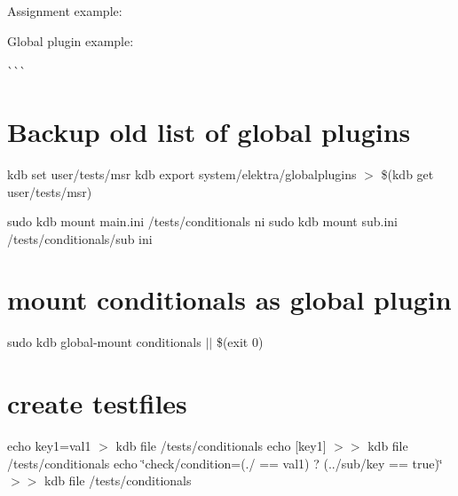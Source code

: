 Assignment example\+:


\begin{DoxyCode}{0}
\DoxyCodeLine{}
\DoxyCodeLine{}
\end{DoxyCode}


Global plugin example\+:

\`{}\`{}\`{} \hypertarget{autotoc_md88_autotoc_md97}{}\section{Backup old list of global plugins}\label{autotoc_md88_autotoc_md97}
kdb set user/tests/msr  kdb export system/elektra/globalplugins $>$ \$(kdb get user/tests/msr)

sudo kdb mount main.\+ini /tests/conditionals ni sudo kdb mount sub.\+ini /tests/conditionals/sub ini\hypertarget{autotoc_md88_autotoc_md98}{}\section{mount conditionals as global plugin}\label{autotoc_md88_autotoc_md98}
sudo kdb global-\/mount conditionals $\vert$$\vert$ \$(exit 0)\hypertarget{autotoc_md88_autotoc_md99}{}\section{create testfiles}\label{autotoc_md88_autotoc_md99}
echo \textquotesingle{}key1=val1\textquotesingle{} $>$ {\ttfamily kdb file /tests/conditionals} echo \textquotesingle{}\mbox{[}key1\mbox{]}\textquotesingle{} $>$$>$ {\ttfamily kdb file /tests/conditionals} echo \char`\"{}check/condition=(./ == \textquotesingle{}val1\textquotesingle{}) ? (../sub/key == \textquotesingle{}true\textquotesingle{})\char`\"{} $>$$>$ {\ttfamily kdb file /tests/conditionals}

